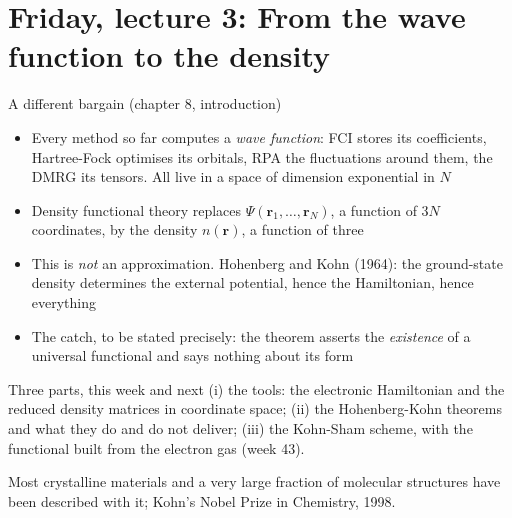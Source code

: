 \documentclass[aspectratio=169,10pt]{beamer}
\begin{document}
\section{Friday, lecture 3: From the wave function to the density}

\begin{frame}{A different bargain (chapter 8, introduction)}
  \begin{itemize}
    \item Every method so far computes a \emph{wave function}: FCI stores its coefficients, Hartree-Fock optimises its orbitals, RPA the fluctuations around them, the DMRG its tensors. All live in a space of dimension exponential in $N$
    \item Density functional theory replaces $\Psi(\bm r_1,\dots,\bm r_N)$, a function of $3N$ coordinates, by the density $n(\bm r)$, a function of \alert{three}
    \item This is \emph{not} an approximation. Hohenberg and Kohn (1964): the ground-state density determines the external potential, hence the Hamiltonian, hence everything
    \item The catch, to be stated precisely: the theorem asserts the \emph{existence} of a universal functional and says nothing about its form
  \end{itemize}
  \vspace{0.4em}
  \begin{block}{Three parts, this week and next}
    (i) the tools: the electronic Hamiltonian and the reduced density matrices in coordinate space; (ii) the Hohenberg-Kohn theorems and what they do and do not deliver; (iii) the Kohn-Sham scheme, with the functional built from the electron gas (week 43).
  \end{block}
  \centering\small Most crystalline materials and a very large fraction of molecular structures have been described with it; Kohn's Nobel Prize in Chemistry, 1998.
\end{frame}
\end{document}
